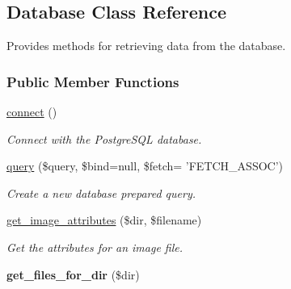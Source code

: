 \hypertarget{classDatabase}{\subsection{Database Class Reference}
\label{classDatabase}
}


Provides methods for retrieving data from the database.  


\subsubsection*{Public Member Functions}
\begin{DoxyCompactItemize}
\item 
\hypertarget{classDatabase_a27f4e88bfd7fcd348e0f544170fb2fbe}{\hyperlink{classDatabase_a27f4e88bfd7fcd348e0f544170fb2fbe}{connect} ()}\label{classDatabase_a27f4e88bfd7fcd348e0f544170fb2fbe}

\begin{DoxyCompactList}\small\item\em Connect with the Postgre\-S\-Q\-L database. \end{DoxyCompactList}\item 
\hyperlink{classDatabase_a18962b53bf38e115cfca934bd2d63d3b}{query} (\$query, \$bind=null, \$fetch= 'F\-E\-T\-C\-H\-\_\-\-A\-S\-S\-O\-C')
\begin{DoxyCompactList}\small\item\em Create a new database prepared query. \end{DoxyCompactList}\item 
\hyperlink{classDatabase_af7bc1f009ae4cfec8a19ce4c1cc0a43a}{get\-\_\-image\-\_\-attributes} (\$dir, \$filename)
\begin{DoxyCompactList}\small\item\em Get the attributes for an image file. \end{DoxyCompactList}\item 
\hypertarget{classDatabase_a6cf70f0c423b4b32d9b2825c74152da4}{{\bfseries get\-\_\-files\-\_\-for\-\_\-dir} (\$dir)}\label{classDatabase_a6cf70f0c423b4b32d9b2825c74152da4}


\end{DoxyCompactItemize}
